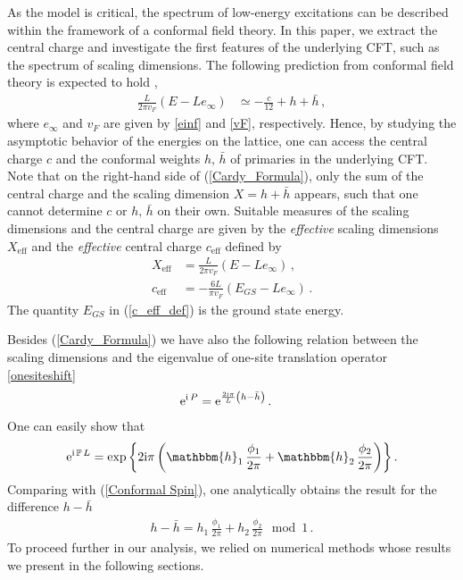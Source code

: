 \documentclass[12pt]{article}
\numberwithin{equation}{section}
\newcommand{\ri}{{\rm i}}
\newcommand{\re}{{\rm e}}
\begin{document}
As the model is critical, the spectrum of low-energy excitations can be described within the framework of a conformal field theory. In this paper, we extract the central charge and investigate the first features of the underlying CFT, such as the spectrum of scaling dimensions. The following prediction from conformal field theory is expected to hold \cite{BlCN86,Affl86,Card86a},
\begin{align}
   \frac{L}{2\pi v_F}\left(E -Le_\infty\right)&\simeq -\frac{c}{12}+h+\bar{h} \,,\label{Cardy_Formula}
\end{align}
where $e_\infty$ and $v_F$ are given by \eqref{einf} and \eqref{vF}, respectively. Hence, by studying the asymptotic behavior of the energies on the lattice, one can access the central charge $c$ and the conformal weights $h,\,\bar{h}$ of primaries in the  underlying CFT. Note that on the right-hand side of (\ref{Cardy_Formula}), only the sum of the central charge and the scaling dimension $X=h+\bar{h}$ appears, such that one cannot determine $c$ or $h,\, \bar{h}$ on their own. Suitable measures of the scaling dimensions and the central charge are given by the \emph{effective} scaling dimensions $X_{\mathrm{eff}}$ and the \emph{effective} central charge $c_{\mathrm{eff}}$ defined by
\begin{align}
   X_{\mathrm{eff}}&= \frac{L}{2\pi v_F}\left(E -Le_\infty\right)\label{X_eff_def} \,, \\
   c_{\mathrm{eff}}&=-\frac{6L}{\pi v_F}\left(E_{GS} -Le_\infty\right)\label{c_eff_def} \,.
\end{align}
The quantity $E_{GS}$ in (\ref{c_eff_def}) is the ground state energy.

Besides (\ref{Cardy_Formula}) we have also the following relation between the scaling dimensions and the eigenvalue of one-site translation operator \eqref{onesiteshift}
\begin{align}
       \re^{\ri \, P}&=\re^{\frac{2\ri \pi}{L}\left(h-\bar{h}\right)}\,.\label{Conformal Spin}
\end{align}
One can easily show that 
\begin{align}
    \re^{\ri \, \mathbb{P}\, L}=\exp{\left\{ 2\ri \pi \left( \mathbbm{h}_1 \, \frac{\phi_1}{2\pi}+\mathbbm{h}_2\,\frac{\phi_2}{2\pi}\right)\right\}}\,.
\end{align}
Comparing with (\ref{Conformal Spin}), one analytically obtains the result for the difference $h-\bar{h}$
\begin{align}
    h-\bar{h}=h_1 \,\frac{\phi_1}{2\pi}+h_2\,\frac{\phi_2}{2\pi} \mod 1\,.\label{h-barh}
\end{align}
To proceed further in our analysis, we relied on numerical methods whose results we present in the following sections.
\end{document}
